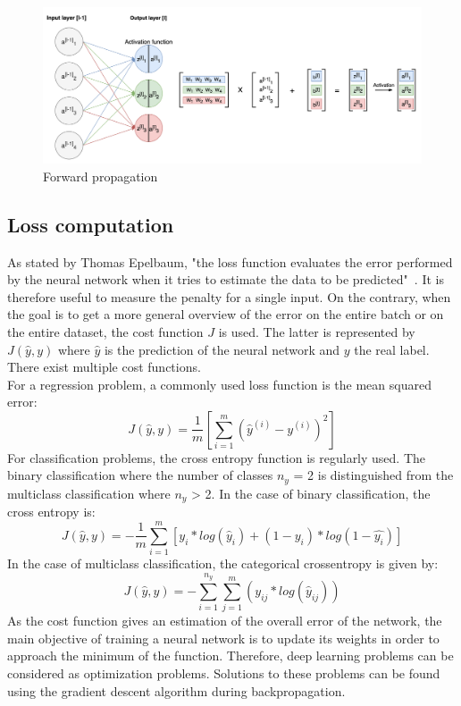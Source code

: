 \begin{figure}[!h]
\centering
\includegraphics[width=1\textwidth, keepaspectratio=true]{./figures/forward_propagation.png}
\caption{Forward propagation }
\label{forward_propagation}
\end{figure}

\subsection{Loss computation}

\setlength{\marginparwidth}{3cm}\leavevmode {}As stated by Thomas Epelbaum, "the loss function evaluates the error performed by the neural network when it tries to estimate the data to be predicted"~\cite{18}. It is therefore useful to measure the penalty for a single input. On the contrary, when the goal is to get a more general overview of the error on the entire batch or on the entire dataset, the cost function $J$ is used. The latter is represented by $J(\hat{y}, y)$ where $\hat{y}$ is the prediction of the neural network and $y$ the real label. There exist multiple cost functions.\\
For a regression problem, a commonly used loss function is the mean squared error:
\begin{equation}
J(\hat{y}, y) = \frac{1}{m}[\sum_{i=1}^{m} (\hat{y}^{(i)} - y^{(i)})^{2}]
\end{equation}
For classification problems, the cross entropy function is regularly used. The binary classification where the number of classes $n_{y}$ = 2 is distinguished from the multiclass classification where $n_{y}$ > 2. In the case of binary classification, the cross entropy is:
\begin{equation}
J(\hat{y}, y) = -\frac{1}{m}\sum_{i=1}^{m} [y_{i}*log(\hat{y}_{i}) + (1-y_{i})*log(1-\hat{y_i})]
\end{equation}
In the case of multiclass classification, the categorical crossentropy is given by:
\begin{equation}
J(\hat{y}, y) = - \sum_{i=1}^{n_{y}} \sum_{j=1}^{m} (y_{ij}*log(\hat{y}_{ij}))
\end{equation}
As the cost function gives an estimation of the overall error of the network, the main objective of training a neural network is to update its weights in order to approach the minimum of the function. Therefore, deep learning problems can be considered as optimization problems. Solutions to these problems can be found using the gradient descent algorithm during backpropagation.

